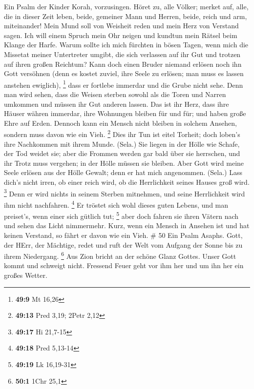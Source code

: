  Ein Psalm der Kinder Korah, vorzusingen.  Höret
zu, alle Völker; merket auf, alle, die in dieser Zeit leben,
 beide, gemeiner Mann und Herren, beide, reich und arm,
miteinander!  Mein Mund soll von Weisheit reden und mein
Herz von Verstand sagen.  Ich will einem Spruch mein Ohr
neigen und kundtun mein Rätsel beim Klange der Harfe.  Warum
sollte ich mich fürchten in bösen Tagen, wenn mich die Missetat meiner
Untertreter umgibt,  die sich verlassen auf ihr Gut und
trotzen auf ihren großen Reichtum?  Kann doch einen Bruder
niemand erlösen noch ihn Gott versöhnen  (denn es kostet
zuviel, ihre Seele zu erlösen; man muss es lassen anstehen ewiglich),
\footnote{\textbf{49:9} Mt 16,26}  dass er fortlebe
immerdar und die Grube nicht sehe.  Denn man wird sehen,
dass die Weisen sterben sowohl als die Toren und Narren umkommen und
müssen ihr Gut anderen lassen.  Das ist ihr Herz, dass ihre
Häuser währen immerdar, ihre Wohnungen bleiben für und für; und haben
große Ehre auf Erden.  Dennoch kann ein Mensch nicht
bleiben in solchem Ansehen, sondern muss davon wie ein Vieh. \footnote{\textbf{49:13}
  Pred 3,19; 2Petr 2,12}  Dies ihr Tun ist eitel Torheit;
doch loben's ihre Nachkommen mit ihrem Munde. (Sela.)  Sie
liegen in der Hölle wie Schafe, der Tod weidet sie; aber die Frommen
werden gar bald über sie herrschen, und ihr Trotz muss vergehen; in der
Hölle müssen sie bleiben.  Aber Gott wird meine Seele
erlösen aus der Hölle Gewalt; denn er hat mich angenommen. (Sela.)
 Lass dich's nicht irren, ob einer reich wird, ob die
Herrlichkeit seines Hauses groß wird. \footnote{\textbf{49:17} Hi
  21,7-15}  Denn er wird nichts in seinem Sterben
mitnehmen, und seine Herrlichkeit wird ihm nicht nachfahren. \footnote{\textbf{49:18}
  Pred 5,13-14}  Er tröstet sich wohl dieses guten Lebens,
und man preiset's, wenn einer sich gütlich tut; \footnote{\textbf{49:19}
  Lk 16,19-31}  aber doch fahren sie ihren Vätern nach und
sehen das Licht nimmermehr.  Kurz, wenn ein Mensch in
Ansehen ist und hat keinen Verstand, so fährt er davon wie ein Vieh. \#
50  Ein Psalm Asaphs. Gott, der HErr, der Mächtige, redet
und ruft der Welt vom Aufgang der Sonne bis zu ihrem Niedergang.
\footnote{\textbf{50:1} 1Chr 25,1}  Aus Zion bricht an der
schöne Glanz Gottes.  Unser Gott kommt und schweigt nicht.
Fressend Feuer geht vor ihm her und um ihn her ein großes Wetter.
